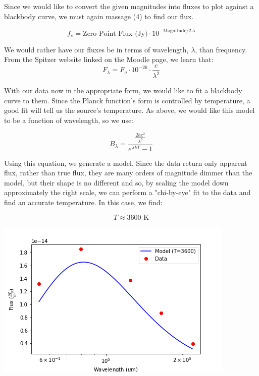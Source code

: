 \documentclass[12pt]{article}
\newenvironment{answer}[2][Answer]{\begin{trivlist}
\item[\hskip \labelsep {\bfseries #1}\hskip \labelsep {\bfseries #2.}]}{\end{trivlist}}
\begin{document}
\begin{answer}{3}

Since we would like to convert the given magnitudes into fluxes to plot against a blackbody curve, we must again massage (4) to find our flux.

\begin{equation}
  f_{\nu} = \text{Zero Point Flux (Jy)} \cdot 10^{-\text{Magnitude}/2.5}
\end{equation}

We would rather have our fluxes be in terms of wavelength, $\lambda$, than frequency. From the Spitzer website linked on the Moodle page, we learn that:
\begin{equation}
  F_{\lambda} = F_{\nu} \cdot 10^{-26} \cdot \frac{c}{\lambda^{2}}
\end{equation}

With our data now in the appropriate form, we would like to fit a blackbody curve to them. Since the Planck function's form is controlled by temperature, a good fit will tell us the source's temperature. As above, we would like this model to be a function of wavelength, so we use:

\begin{equation}
  B_{\lambda} = \frac{\frac{2hc^{2}}{\lambda^{5}}}{e^{\lambda k T} - 1}
\end{equation}

Using this equation, we generate a model. Since the data return only apparent flux, rather than true flux, they are many orders of magnitude dimmer than the model, but their shape is no different and so, by scaling the model down approximately the right scale, we can perform a "chi-by-eye" fit to the data and find an accurate temperature. In this case, we find:

$$T \approx 3600 \text{ K} $$

\end{answer}

\bigskip
\bigskip

\includegraphics [scale=0.9] {prob3}
\end{document}
